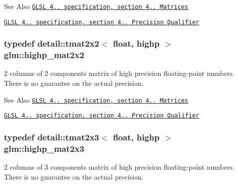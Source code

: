 \begin{DoxySeeAlso}{See Also}
\href{http://www.opengl.org/registry/doc/GLSLangSpec.4.20.8.pdf}{\tt G\-L\-S\-L 4.. specification, section 4.. Matrices} 

\href{http://www.opengl.org/registry/doc/GLSLangSpec.4.20.8.pdf}{\tt G\-L\-S\-L 4.. specification, section 4.. Precision Qualifier} 
\end{DoxySeeAlso}
\hypertarget{group__core__precision_ga694146b8d430b22caa8b37571d9bc8bc}{
\subsubsection[{highp\-\_\-mat2x2}]{\setlength{\rightskip}{0pt plus 5cm}typedef detail\-::tmat2x2$<$ float, highp $>$ {\bf glm\-::highp\-\_\-mat2x2}}}\label{group__core__precision_ga694146b8d430b22caa8b37571d9bc8bc}
2 columns of 2 components matrix of high precision floating-\/point numbers. There is no guarantee on the actual precision.

\begin{DoxySeeAlso}{See Also}
\href{http://www.opengl.org/registry/doc/GLSLangSpec.4.20.8.pdf}{\tt G\-L\-S\-L 4.. specification, section 4.. Matrices} 

\href{http://www.opengl.org/registry/doc/GLSLangSpec.4.20.8.pdf}{\tt G\-L\-S\-L 4.. specification, section 4.. Precision Qualifier} 
\end{DoxySeeAlso}
\hypertarget{group__core__precision_ga7d4e5a1c803be5688c75241c924dfa58}{
\subsubsection[{highp\-\_\-mat2x3}]{\setlength{\rightskip}{0pt plus 5cm}typedef detail\-::tmat2x3$<$ float, highp $>$ {\bf glm\-::highp\-\_\-mat2x3}}}\label{group__core__precision_ga7d4e5a1c803be5688c75241c924dfa58}
2 columns of 3 components matrix of high precision floating-\/point numbers. There is no guarantee on the actual precision.

